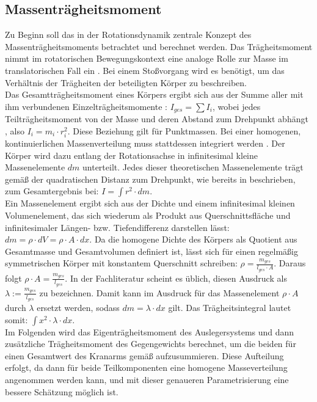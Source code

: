 \subsection{Massenträgheitsmoment}
Zu Beginn soll das in der Rotationsdynamik zentrale Konzept des Massenträgheitsmoments betrachtet und berechnet werden. Das Trägheitsmoment nimmt im rotatorischen Bewegungskontext eine analoge Rolle zur Masse im translatorischen Fall ein \parencite{boege_gegenueberstellung}. Bei einem Stoßvorgang wird es benötigt, um das Verhältnis der Trägheiten der beteiligten Körper zu beschreiben.
\\
Das Gesamtträgheitsmoment eines Körpers ergibt sich aus der Summe aller mit ihm verbundenen Einzelträgheitsmomente \parencite{brenneke_schuster_ges-traegheit}:
$I_{ges} = \sum I_i$, wobei jedes Teilträgheitsmoment von der Masse und deren Abstand zum Drehpunkt abhängt \parencite{brenneke_schuster_ges-traegheit}, also $I_i = m_i \cdot r_i^2$.
Diese Beziehung gilt für Punktmassen. Bei einer homogenen, kontinuierlichen Massenverteilung muss stattdessen integriert werden \parencite{tipler_traegheitsmoment}. Der Körper wird dazu entlang der Rotationsachse in infinitesimal kleine Massenelemente $dm$ unterteilt. Jedes dieser theoretischen Massenelemente trägt gemäß der quadratischen Distanz zum Drehpunkt, wie bereits in \parencite{brenneke_schuster_ges-traegheit} beschrieben, zum Gesamtergebnis bei:
$I = \int r^2 \cdot dm$.
\\
Ein Massenelement ergibt sich aus der Dichte und einem infinitesimal kleinen Volumenelement, das sich wiederum als Produkt aus Querschnittsfläche und infinitesimaler Längen- bzw. Tiefendifferenz darstellen lässt: $dm = \rho \cdot dV = \rho \cdot A \cdot dx$.  
Da die homogene Dichte des Körpers als Quotient aus Gesamtmasse und Gesamtvolumen definiert ist, lässt sich für einen regelmäßig symmetrischen Körper mit konstantem Querschnitt schreiben: $\rho = \tfrac{m_{ges}}{l_{ges} \cdot A}$. Daraus folgt $\rho \cdot A = \tfrac{m_{ges}}{l_{ges}}$.  
In der Fachliteratur scheint es üblich, %
diesen Ausdruck als $\lambda := \tfrac{m_{ges}}{l_{ges}}$ zu bezeichnen. Damit kann im Ausdruck für das Massenelement $\rho \cdot A$ durch $\lambda$ ersetzt werden, sodass $dm = \lambda \cdot dx$ gilt. Das Trägheitsintegral lautet somit: $\int x^2 \cdot \lambda \cdot dx$.
\\
Im Folgenden wird das Eigenträgheitsmoment des Auslegersystems und dann zusätzliche Trägheitsmoment des Gegengewichts berechnet, um die beiden für einen Gesamtwert des Kranarms gemäß\parencite{brenneke_schuster_ges-traegheit} aufzusummieren. Diese Aufteilung erfolgt, da dann für beide Teilkomponenten eine homogene Masseverteilung angenommen werden kann, und mit dieser genaueren Parametrisierung eine bessere Schätzung möglich ist. 


